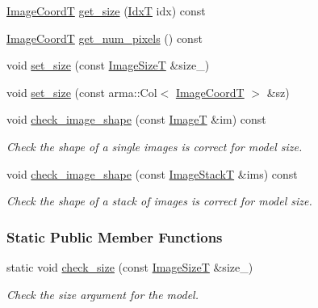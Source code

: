\begin{DoxyCompactItemize}
\item 
\hyperlink{classmappel_1_1ImageFormat1DBase_a82ab3168eb1a87eaeb3e7c919188e9fc}{Image\+CoordT} \hyperlink{classmappel_1_1ImageFormat1DBase_a995bdd3b1be616d8d87af3a4a51fbad8}{get\+\_\+size} (\hyperlink{namespacemappel_ab17ec0f30b61ece292439d7ece81d3a8}{IdxT} idx) const 
\item 
\hyperlink{classmappel_1_1ImageFormat1DBase_a82ab3168eb1a87eaeb3e7c919188e9fc}{Image\+CoordT} \hyperlink{classmappel_1_1ImageFormat1DBase_a96644883bef9d230eea893ece4578e96}{get\+\_\+num\+\_\+pixels} () const 
\item 
void \hyperlink{classmappel_1_1ImageFormat1DBase_ad169407f15bd43b0cec18fa2c88725b7}{set\+\_\+size} (const \hyperlink{classmappel_1_1ImageFormat1DBase_a6456bab2b26702022ee32ae19e90dcac}{Image\+SizeT} \&size\+\_\+)
\item 
void \hyperlink{classmappel_1_1ImageFormat1DBase_ae35eebe826c2ffdb6e0b599806c88667}{set\+\_\+size} (const arma\+::\+Col$<$ \hyperlink{classmappel_1_1ImageFormat1DBase_a82ab3168eb1a87eaeb3e7c919188e9fc}{Image\+CoordT} $>$ \&sz)
\item 
void \hyperlink{classmappel_1_1ImageFormat1DBase_af308ca86f413f65e72ea7b8c890bd87a}{check\+\_\+image\+\_\+shape} (const \hyperlink{classmappel_1_1ImageFormat1DBase_a521a1ff391a52a636fac4aac7c7ba02c}{ImageT} \&im) const 
\begin{DoxyCompactList}\small\item\em Check the shape of a single images is correct for model size. \end{DoxyCompactList}\item 
void \hyperlink{classmappel_1_1ImageFormat1DBase_a8d5c0744643bf0bbbf30dd3122f98190}{check\+\_\+image\+\_\+shape} (const \hyperlink{classmappel_1_1ImageFormat1DBase_a81e3246d1c5c37ebf9077b7b5bd25a76}{Image\+StackT} \&ims) const 
\begin{DoxyCompactList}\small\item\em Check the shape of a stack of images is correct for model size. \end{DoxyCompactList}\end{DoxyCompactItemize}
\subsubsection*{Static Public Member Functions}
\begin{DoxyCompactItemize}
\item 
static void \hyperlink{classmappel_1_1ImageFormat1DBase_a2eb986335c4d1405de65217456735ba4}{check\+\_\+size} (const \hyperlink{classmappel_1_1ImageFormat1DBase_a6456bab2b26702022ee32ae19e90dcac}{Image\+SizeT} \&size\+\_\+)
\begin{DoxyCompactList}\small\item\em Check the size argument for the model. \end{DoxyCompactList}\end{DoxyCompactItemize}
